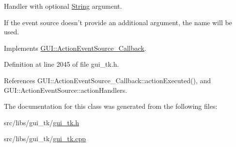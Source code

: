 Handler with optional \hyperlink{classGUI_1_1String}{String} argument. 

If the event source doesn't provide an additional argument, the name will be used. 

Implements \hyperlink{structGUI_1_1ActionEventSource__Callback_a36df23a424558a83b45e3e3d5c175cf2}{G\-U\-I\-::\-Action\-Event\-Source\-\_\-\-Callback}.



Definition at line 2045 of file gui\-\_\-tk.\-h.



References G\-U\-I\-::\-Action\-Event\-Source\-\_\-\-Callback\-::action\-Executed(), and G\-U\-I\-::\-Action\-Event\-Source\-::action\-Handlers.



The documentation for this class was generated from the following files\-:\begin{DoxyCompactItemize}
\item 
src/libs/gui\-\_\-tk/\hyperlink{gui__tk_8h}{gui\-\_\-tk.\-h}\item 
src/libs/gui\-\_\-tk/\hyperlink{gui__tk_8cpp}{gui\-\_\-tk.\-cpp}\end{DoxyCompactItemize}
